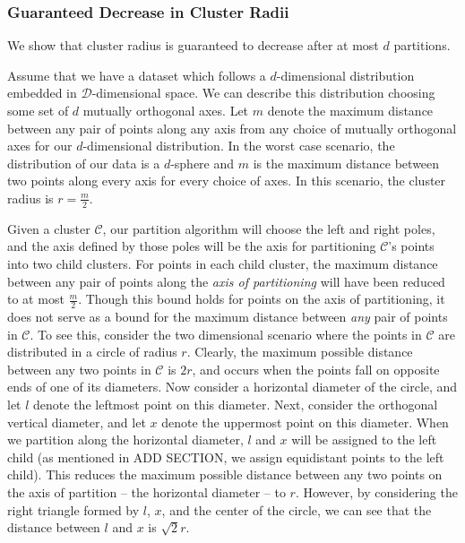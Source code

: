 \subsubsection {Guaranteed Decrease in Cluster Radii}
\label{subsubsec:methods:guaranteed-decrease-in-cluster-radii}

We show that cluster radius is guaranteed to decrease after at most $d$ partitions.

Assume that we have a dataset which follows a $d$-dimensional distribution embedded in $\mathcal{D}$-dimensional space.
We can describe this distribution choosing some set of $d$ mutually orthogonal axes.
Let $m$ denote the maximum distance between any pair of points along any axis from any choice of mutually orthogonal axes for our $d$-dimensional distribution.
In the worst case scenario, the distribution of our data is a $d$-sphere and $m$ is the maximum distance between two points along every axis for every choice of axes.
In this scenario, the cluster radius is $r = \frac{m}{2}$.

Given a cluster $\mathcal{C}$, our partition algorithm will choose the left and right poles, 
and the axis defined by those poles will be the axis for partitioning $\mathcal{C}$'s points into two child clusters.
For points in each child cluster, the maximum distance between any pair of points along the \emph{axis of partitioning} will have been reduced to at most $\frac{m}{2}$.
Though this bound holds for points on the axis of partitioning, it does not serve as a bound for the maximum distance between \emph{any} pair of points in $\mathcal{C}$.
To see this, consider the two dimensional scenario where the points in $\mathcal{C}$ are distributed in a circle of radius $r$. Clearly, the maximum possible distance between 
any two points in $\mathcal{C}$ is $2r$, and occurs when the points fall on opposite ends of one of its diameters. Now consider a horizontal diameter of the circle, 
and let $l$ denote the leftmost point on this diameter. Next, consider the orthogonal vertical diameter, and let $x$ denote the uppermost point on this diameter. When we 
partition along the horizontal diameter, $l$ and $x$ will be assigned to the left child (as mentioned in ADD SECTION, we assign equidistant points to the left child). 
This reduces the maximum possible distance between any two points on the axis of partition -- the horizontal diameter -- to $r$. However, by considering the 
right triangle formed by $l$, $x$, and the center of the circle, we can see that the distance between 
$l$ and $x$ is $\sqrt{2}{r}$.


